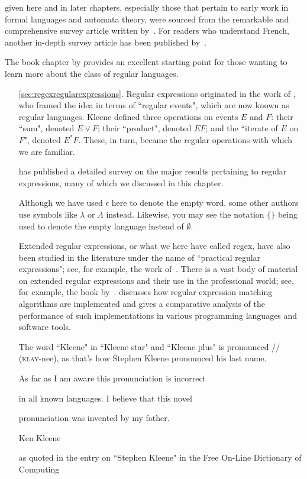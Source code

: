 
 given here and in later chapters, especially those that pertain to early work in formal languages and automata theory, were sourced from the remarkable and comprehensive survey article written by~\citet{Greibach1981FormalLanguagesOrigins}. For readers who understand French, another in-depth survey article has been published by~\citet{Perrin1995DebutsTheorieAutomates}.

The book chapter by \citet{Yu1997RegularLanguages} provides an excellent starting point for those wanting to learn more about the class of regular languages.

\begin{enumerate}
\item[\ref{sec:regexregularexpressions}.] Regular expressions originated in the work of \citet{Kleene1951RepresentationEvents, Kleene1956RepresentationEvents}, who framed the idea in terms of ``regular events", which are now known as regular languages. Kleene defined three operations on events $E$ and $F$: their ``sum", denoted $E \vee F$; their ``product", denoted $EF$; and the ``iterate of $E$ on $F$", denoted $E^{*}F$. These, in turn, became the regular operations with which we are familiar.

\citet{Brzozowski1962SurveyRegularExpressions} has published a detailed survey on the major results pertaining to regular expressions, many of which we discussed in this chapter.

Although we have used $\epsilon$ here to denote the empty word, some other authors use symbols like $\lambda$ or $\Lambda$ instead. Likewise, you may see the notation $\{\}$ being used to denote the empty language instead of $\emptyset$.

Extended regular expressions, or what we here have called regex, have also been studied in the literature under the name of ``practical regular expressions"; see, for example, the work of~\citet*{Campeanu2003PracticalRegex}. There is a vast body of material on extended regular expressions and their use in the professional world; see, for example, the book by~\citet{Friedl2006MasteringRegularExpressions}. \citet{Cox2007RegexMatchingSimpleFast} discusses how regular expression matching algorithms are implemented and gives a comparative analysis of the performance of such implementations in various programming languages and software tools.

The word ``Kleene" in ``Kleene star" and ``Kleene plus" is pronounced // (\textsc{klay}-nee), as that's how Stephen Kleene pronounced his last name.\par
\epigraph{As far as I am aware this pronunciation is incorrect\par
in all known languages. I believe that this novel\par
pronunciation was invented by my father.}{Ken Kleene}{as quoted in the entry on ``Stephen Kleene" in the Free On-Line Dictionary of Computing}{}
\vspace{1em}


\end{enumerate}

